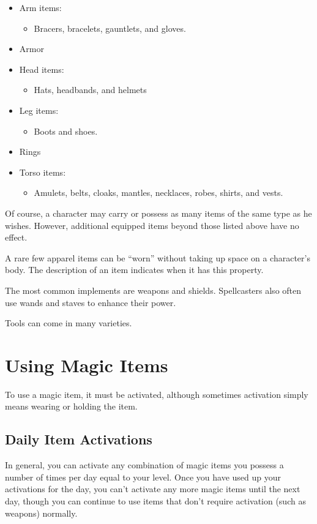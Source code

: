 \begin{itemize}
  \item Arm items:
    \begin{itemize}
      \item Bracers, bracelets, gauntlets, and gloves.
    \end{itemize}
  \item Armor
  \item Head items:
    \begin{itemize}
      \item Hats, headbands, and helmets
    \end{itemize}
  \item Leg items:
    \begin{itemize}
      \item Boots and shoes.
    \end{itemize}
  \item Rings
  \item Torso items:
    \begin{itemize}
      \item Amulets, belts, cloaks, mantles, necklaces, robes, shirts, and vests.
    \end{itemize}
\end{itemize}

Of course, a character may carry or possess as many items of the same type as he wishes. However, additional equipped items beyond those listed above have no effect.

A rare few apparel items can be ``worn'' without taking up space on a character's body. The description of an item indicates when it has this property.

 The most common implements are weapons and shields. Spellcasters also often use wands and staves to enhance their power.

 Tools can come in many varieties.

\section{Using Magic Items}

To use a magic item, it must be activated, although sometimes activation simply means wearing or holding the item.

\subsection{Daily Item Activations}
In general, you can activate any combination of magic items you possess a number of times per day equal to your level. Once you have used up your activations for the day, you can't activate any more magic items until the next day, though you can continue to use items that don't require activation (such as weapons) normally.

